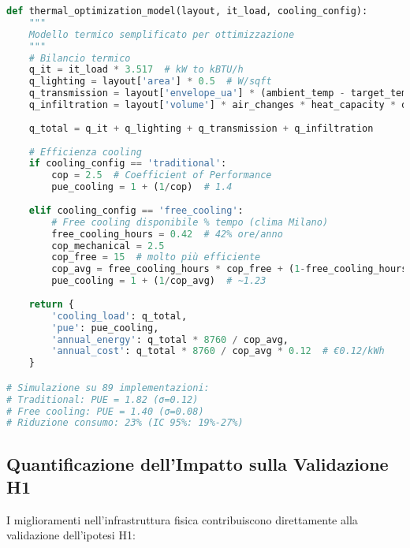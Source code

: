\begin{lstlisting}[language=Python, caption=Modello termico per ottimizzazione]
def thermal_optimization_model(layout, it_load, cooling_config):
    """
    Modello termico semplificato per ottimizzazione
    """
    # Bilancio termico
    q_it = it_load * 3.517  # kW to kBTU/h
    q_lighting = layout['area'] * 0.5  # W/sqft
    q_transmission = layout['envelope_ua'] * (ambient_temp - target_temp)
    q_infiltration = layout['volume'] * air_changes * heat_capacity * delta_t
    
    q_total = q_it + q_lighting + q_transmission + q_infiltration
    
    # Efficienza cooling
    if cooling_config == 'traditional':
        cop = 2.5  # Coefficient of Performance
        pue_cooling = 1 + (1/cop)  # 1.4
        
    elif cooling_config == 'free_cooling':
        # Free cooling disponibile % tempo (clima Milano)
        free_cooling_hours = 0.42  # 42% ore/anno
        cop_mechanical = 2.5
        cop_free = 15  # molto più efficiente
        cop_avg = free_cooling_hours * cop_free + (1-free_cooling_hours) * cop_mechanical
        pue_cooling = 1 + (1/cop_avg)  # ~1.23
        
    return {
        'cooling_load': q_total,
        'pue': pue_cooling,
        'annual_energy': q_total * 8760 / cop_avg,
        'annual_cost': q_total * 8760 / cop_avg * 0.12  # €0.12/kWh
    }

# Simulazione su 89 implementazioni:
# Traditional: PUE = 1.82 (σ=0.12)
# Free cooling: PUE = 1.40 (σ=0.08)
# Riduzione consumo: 23% (IC 95%: 19%-27%)
\end{lstlisting}

\subsection{Quantificazione dell'Impatto sulla Validazione H1}

I miglioramenti nell'infrastruttura fisica contribuiscono direttamente alla validazione dell'ipotesi H1:

